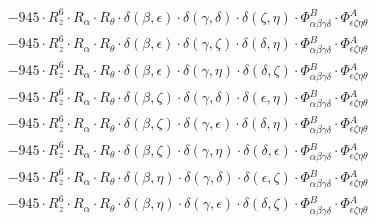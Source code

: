 \documentclass{article}
\begin{document}
\begin{equation}
\begin{array}{c}
 \\[0.2em] 		 - 945 \cdot R_{z}^{6} \cdot R_{\alpha{}} \cdot R_{\theta{}} \cdot \delta{}\left(\beta{}, \epsilon{}\right) \cdot \delta{}\left(\gamma{}, \delta{}\right) \cdot \delta{}\left(\zeta{}, \eta{}\right) \cdot \Phi{}^{B}_{\alpha{}\beta{}\gamma{}\delta{}} \cdot \Phi{}^{A}_{\epsilon{}\zeta{}\eta{}\theta{}} 
 \\[0.2em] 		 - 945 \cdot R_{z}^{6} \cdot R_{\alpha{}} \cdot R_{\theta{}} \cdot \delta{}\left(\beta{}, \epsilon{}\right) \cdot \delta{}\left(\gamma{}, \zeta{}\right) \cdot \delta{}\left(\delta{}, \eta{}\right) \cdot \Phi{}^{B}_{\alpha{}\beta{}\gamma{}\delta{}} \cdot \Phi{}^{A}_{\epsilon{}\zeta{}\eta{}\theta{}} 
 \\[0.2em] 		 - 945 \cdot R_{z}^{6} \cdot R_{\alpha{}} \cdot R_{\theta{}} \cdot \delta{}\left(\beta{}, \epsilon{}\right) \cdot \delta{}\left(\gamma{}, \eta{}\right) \cdot \delta{}\left(\delta{}, \zeta{}\right) \cdot \Phi{}^{B}_{\alpha{}\beta{}\gamma{}\delta{}} \cdot \Phi{}^{A}_{\epsilon{}\zeta{}\eta{}\theta{}} 
 \\[0.2em] 		 - 945 \cdot R_{z}^{6} \cdot R_{\alpha{}} \cdot R_{\theta{}} \cdot \delta{}\left(\beta{}, \zeta{}\right) \cdot \delta{}\left(\gamma{}, \delta{}\right) \cdot \delta{}\left(\epsilon{}, \eta{}\right) \cdot \Phi{}^{B}_{\alpha{}\beta{}\gamma{}\delta{}} \cdot \Phi{}^{A}_{\epsilon{}\zeta{}\eta{}\theta{}} 
 \\[0.2em] 		 - 945 \cdot R_{z}^{6} \cdot R_{\alpha{}} \cdot R_{\theta{}} \cdot \delta{}\left(\beta{}, \zeta{}\right) \cdot \delta{}\left(\gamma{}, \epsilon{}\right) \cdot \delta{}\left(\delta{}, \eta{}\right) \cdot \Phi{}^{B}_{\alpha{}\beta{}\gamma{}\delta{}} \cdot \Phi{}^{A}_{\epsilon{}\zeta{}\eta{}\theta{}} 
 \\[0.2em] 		 - 945 \cdot R_{z}^{6} \cdot R_{\alpha{}} \cdot R_{\theta{}} \cdot \delta{}\left(\beta{}, \zeta{}\right) \cdot \delta{}\left(\gamma{}, \eta{}\right) \cdot \delta{}\left(\delta{}, \epsilon{}\right) \cdot \Phi{}^{B}_{\alpha{}\beta{}\gamma{}\delta{}} \cdot \Phi{}^{A}_{\epsilon{}\zeta{}\eta{}\theta{}} 
 \\[0.2em] 		 - 945 \cdot R_{z}^{6} \cdot R_{\alpha{}} \cdot R_{\theta{}} \cdot \delta{}\left(\beta{}, \eta{}\right) \cdot \delta{}\left(\gamma{}, \delta{}\right) \cdot \delta{}\left(\epsilon{}, \zeta{}\right) \cdot \Phi{}^{B}_{\alpha{}\beta{}\gamma{}\delta{}} \cdot \Phi{}^{A}_{\epsilon{}\zeta{}\eta{}\theta{}} 
 \\[0.2em] 		 - 945 \cdot R_{z}^{6} \cdot R_{\alpha{}} \cdot R_{\theta{}} \cdot \delta{}\left(\beta{}, \eta{}\right) \cdot \delta{}\left(\gamma{}, \epsilon{}\right) \cdot \delta{}\left(\delta{}, \zeta{}\right) \cdot \Phi{}^{B}_{\alpha{}\beta{}\gamma{}\delta{}} \cdot \Phi{}^{A}_{\epsilon{}\zeta{}\eta{}\theta{}} 

\end{array}
\end{equation}
\end{document}
